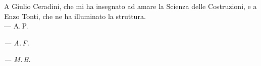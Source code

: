 
\begin{dedication}
A Giulio Ceradini, che mi ha insegnato ad amare
la Scienza delle Costruzioni, e a Enzo Tonti,
che ne ha illuminato la struttura.\\[0.5ex]
\upshape --- A.\,P.

\bigskip\bigskip

\itshape
\upshape --- A.\,F.

\bigskip\bigskip

\itshape
\upshape --- M.\,B.
\end{dedication}
